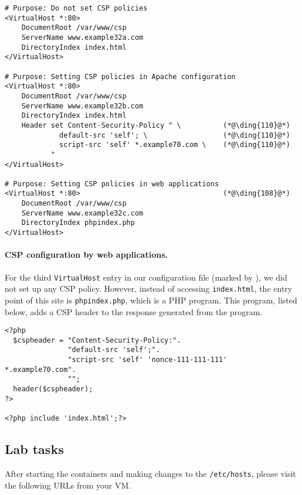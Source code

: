 \begin{lstlisting}
# Purpose: Do not set CSP policies
<VirtualHost *:80>
    DocumentRoot /var/www/csp
    ServerName www.example32a.com
    DirectoryIndex index.html
</VirtualHost>

# Purpose: Setting CSP policies in Apache configuration
<VirtualHost *:80>
    DocumentRoot /var/www/csp
    ServerName www.example32b.com
    DirectoryIndex index.html
    Header set Content-Security-Policy " \          (*@\ding{110}@*)
             default-src 'self'; \                  (*@\ding{110}@*)
             script-src 'self' *.example70.com \    (*@\ding{110}@*)
           "
</VirtualHost>

# Purpose: Setting CSP policies in web applications
<VirtualHost *:80>                                  (*@\ding{108}@*)
    DocumentRoot /var/www/csp
    ServerName www.example32c.com
    DirectoryIndex phpindex.php
</VirtualHost>
\end{lstlisting}
 

\paragraph{CSP configuration by web applications.}
For the third \texttt{VirtualHost} entry in our configuration
file (marked by ), we did not set up any CSP policy.
However, instead of accessing \texttt{index.html}, the 
entry point of this site is \texttt{phpindex.php}, which
is a PHP program. This program, listed below, adds 
a CSP header to the response generated from the program. 

\begin{lstlisting}
<?php
  $cspheader = "Content-Security-Policy:".
               "default-src 'self';".
               "script-src 'self' 'nonce-111-111-111' *.example70.com".
               "";
  header($cspheader);
?>

<?php include 'index.html';?>
\end{lstlisting}



\subsection{Lab tasks} 


After starting the containers and making changes to the \texttt{/etc/hosts}, please visit
the following URLs from your VM. 

